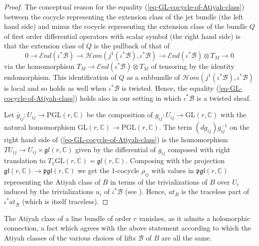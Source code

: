 \documentclass[12pt]{amsart}
\numberwithin{equation}{subsection}
\theoremstyle{plain}
\theoremstyle{definition}
\newcommand{\B}{{\mathcal B}}
\newcommand{\CC}{{\mathbb C}}
\newcommand{\LieAlg}[1]{{\mathfrak #1}}
\newcommand{\SheafHom}{{\mathcal H}om}
\newcommand{\SheafEnd}{{\mathcal E}nd}
\begin{document}
{\begin{proof}
The conceptual reason for the equality (\ref{eq-GL-cocycle-of-Atiyah-class}) between the cocycle representing the extension class of the jet bundle (the left hand side) and minus the cocycle representing the extension class of the bundle $Q$ of first order differential operators with scalar symbol (the right hand side) is that the extension class of $Q$ is the pullback of that of 
\[
0\rightarrow \SheafEnd(\iota^*\B) \rightarrow \SheafHom(j^1(\iota^*\B),\iota^*\B)\rightarrow \SheafEnd(\iota^*\B)\otimes T_M\rightarrow 0
\]
via the homomorphism $T_M\rightarrow \SheafEnd(\iota^*\B)\otimes T_M$ of tensoring by the identity endomorphism. 
This identification of $Q$ as a subbundle of $\SheafHom(j^1(\iota^*\B),\iota^*\B)$ is local and so holds as well when $\iota^*\B$ is twisted. 
Hence, the equality (\ref{eq-GL-cocycle-of-Atiyah-class}) holds also in our setting in which $\iota^*\B$ is a twisted sheaf.

Let $\bar{g}_{ij}:U_{ij}\rightarrow \mbox{PGL}(r,\CC)$ be the composition of $g_{ij}:U_{ij}\rightarrow \mbox{GL}(r,\CC)$ with the natural homomorphism
$\mbox{GL}(r,\CC)\rightarrow\mbox{PGL}(r,\CC)$. The term $(dg_{ij})g_{ij}^{-1}$ on the right hand side of (\ref{eq-GL-cocycle-of-Atiyah-class})
is the homomorphism $TU_{ij}\rightarrow U_{ij}\times\LieAlg{gl}(r,\CC)$ given by the differential of $g_{ij}$ composed with right translation to $T_1\mbox{GL}(r,\CC)=\LieAlg{gl}(r,\CC)$. Composing with the projection $\mathfrak{gl}(r,\CC)\rightarrow \mathfrak{pgl}(r,\CC)$ we get the $1$-cocycle $\rho_{ij}$ with values in $\mathfrak{pgl}(r,\CC)$
representing the Atiyah class of $B$ in terms of the trivializations of $B$ over $U_i$ induced by the trivializations $u_i$ of $\iota^*\B$ (see \cite[Eq. (2)]{atiyah}).
Hence, $at_B$ is the traceless part of $\iota^*at_\B^{}$ (which is itself traceless).
\end{proof}

The Atiyah class of a line bundle of order $r$ vanishes, as it admits a holomorphic connection, a fact which agrees with the above statement 
according to which the Atiyah classes of the various choices of lifts $\B$ of $B$ are all the same. 

}

% 
\end{document}
